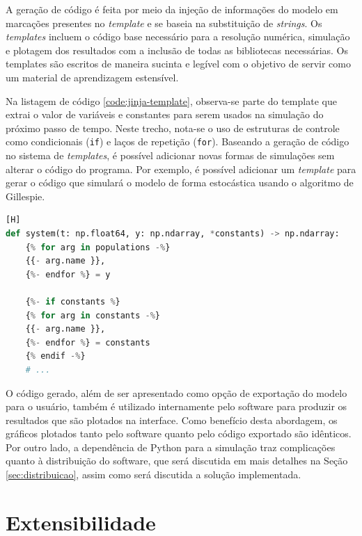 \documentclass[
	12pt,				%
	openright,			%
	oneside,			%
	a4paper,			%
	main=brazil,
	english,			%
	]{ufsj-abntex2}
\begin{document}
A geração de código é feita por meio da injeção de informações do modelo em marcações presentes no \textit{template} e se baseia na substituição de \textit{strings}. Os \textit{templates} incluem o código base necessário para a resolução numérica, simulação e plotagem dos resultados com a inclusão de todas as bibliotecas necessárias. Os templates são escritos de maneira sucinta e legível com o objetivo de servir como um material de aprendizagem estensível.

Na listagem de código \ref{code:jinja-template}, observa-se parte do template que extrai o valor de variáveis e constantes para serem usados na simulação do próximo passo de tempo. Neste trecho, nota-se o uso de estruturas de controle como condicionais (\texttt{if}) e laços de repetição (\texttt{for}). Baseando a geração de código no sistema de \textit{templates}, é possível adicionar novas formas de simulações sem alterar o código do programa. Por exemplo, é possível adicionar um \textit{template} para gerar o código que simulará o modelo de forma estocástica usando o algoritmo de Gillespie.

\begin{lstlisting}[language=Python, label=code:jinja-template, caption=Trecho do \textit{template} responsável por extrair o valor de variáveis e constantes][H]
def system(t: np.float64, y: np.ndarray, *constants) -> np.ndarray:
    {% for arg in populations -%}
    {{- arg.name }},
    {%- endfor %} = y

    {%- if constants %}
    {% for arg in constants -%}
    {{- arg.name }},
    {%- endfor %} = constants
    {% endif -%}
    # ...
\end{lstlisting}

O código gerado, além de ser apresentado como opção de exportação do modelo para o usuário, também é utilizado internamente pelo software para produzir os resultados que são plotados na interface. Como benefício desta abordagem, os gráficos plotados tanto pelo software quanto pelo código exportado são idênticos. Por outro lado, a dependência de Python para a simulação traz complicações quanto à distribuição do software, que será discutida em mais detalhes na Seção \ref{sec:distribuicao}, assim como será discutida a solução implementada.

\section{Extensibilidade}
\label{sec:extensibilidade}
\end{document}
